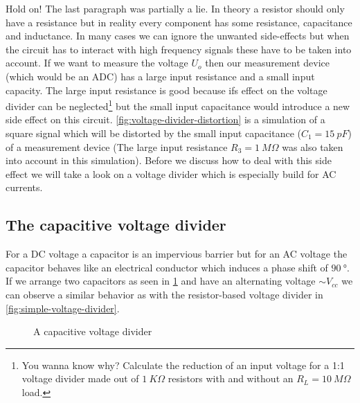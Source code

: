 Hold on! The last paragraph was partially a lie. In theory a resistor should only have a resistance but in reality every component has some resistance, capacitance and inductance. In many cases we can ignore the unwanted side-effects but when the circuit has to interact with high frequency signals these have to be taken into account. If we want to measure the voltage $U_o$ then our measurement device (which would be an ADC) has a large input resistance and a small input capacity. The large input resistance is good because ifs effect on the voltage divider can be neglected\footnote{You wanna know why? Calculate the reduction of an input voltage for a 1:1 voltage divider made out of $\SI{1}{K\Omega}$ resistors with and without an $R_L = \SI{10}{M\Omega}$ load.} but the small input capacitance would introduce a new side effect on this circuit. \cref{fig:voltage-divider-distortion} is a simulation of a square signal which will be distorted by the small input capacitance ($C_1 = \SI{15}{pF}$) of a measurement device (The large input resistance $R_3 = \SI{1}{M\Omega}$ was also taken into account in this simulation). Before we discuss how to deal with this side effect we will take a look on a voltage divider which is especially build for AC currents.


\subsection{The capacitive voltage divider}

For a DC voltage a capacitor is an impervious barrier but for an AC voltage the capacitor behaves like an electrical conductor which induces a phase shift of $\SI{90}{\degree}$. If we arrange two capacitors as seen in \cref{fig:capacitive-voltage-divider} and have an alternating voltage $\sim V_{cc}$ we can observe a similar behavior as with the resistor-based voltage divider in \cref{fig:simple-voltage-divider}.


\begin{figure}[htb]
	\centering
	\caption{A capacitive voltage divider}
	\label{fig:capacitive-voltage-divider}
\end{figure}


